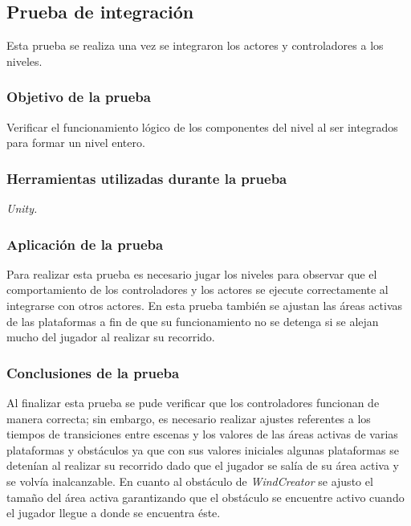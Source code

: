 \subsection{Prueba de integración}
Esta prueba se realiza una vez se integraron los actores y controladores a los 
niveles.
\subsubsection{Objetivo de la prueba}
Verificar el funcionamiento lógico de los componentes del nivel al ser integrados 
para formar un nivel entero. 
\subsubsection{Herramientas utilizadas durante la prueba}
\textit{Unity.}
\subsubsection{Aplicación de la prueba}
Para realizar esta prueba es necesario jugar los niveles para observar que el 
comportamiento de los controladores y los actores se ejecute correctamente al 
integrarse con otros actores. En esta prueba también se ajustan las áreas activas de las 
plataformas a fin de que su funcionamiento no se detenga si se alejan mucho del 
jugador al realizar su recorrido.
                
\subsubsection{Conclusiones de la prueba}
Al finalizar esta prueba se pude verificar que los controladores funcionan de 
manera correcta; sin embargo, es necesario realizar ajustes referentes a los 
tiempos de transiciones entre escenas y los valores de las áreas activas de 
varias plataformas y obstáculos ya que con sus valores iniciales algunas 
plataformas se detenían al realizar su recorrido dado que el jugador se salía 
de su área activa y se volvía inalcanzable. En cuanto al obstáculo de 
\textit{WindCreator} se ajusto el tamaño del área activa garantizando que el 
obstáculo se encuentre activo cuando el jugador llegue a donde se encuentra éste.  



